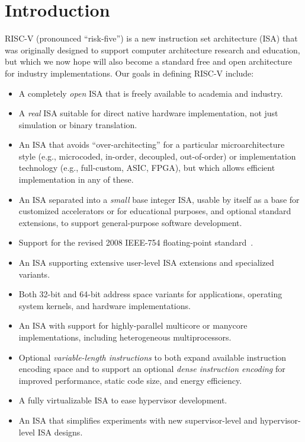\chapter{Introduction}

RISC-V (pronounced ``risk-five'') is a new instruction set
architecture (ISA) that was originally designed to support computer
architecture research and education, but which we now hope will also
become a standard free and open architecture for industry
implementations.  Our goals in defining RISC-V include:
\vspace{-0.1in}
\begin{itemize}
\parskip 0pt
\itemsep 1pt
\item A completely {\em open} ISA that is freely available to
  academia and industry.
\item A {\em real} ISA suitable for direct native hardware implementation,
  not just simulation or binary translation.
\item An ISA that avoids ``over-architecting'' for a particular
  microarchitecture style (e.g., microcoded, in-order, decoupled,
  out-of-order) or implementation technology (e.g., full-custom, ASIC,
  FPGA), but which allows efficient implementation in any of these.
\item An ISA separated into a {\em small} base integer ISA, usable by
  itself as a base for customized accelerators or for educational
  purposes, and optional standard extensions, to support
  general-purpose software development.
\item Support for the revised 2008 IEEE-754 floating-point standard~\cite{ieee754-2008}.
\item An ISA supporting extensive user-level ISA extensions and
  specialized variants.
\item Both 32-bit and 64-bit address space variants for
  applications, operating system kernels, and hardware implementations.
\item An ISA with support for highly-parallel multicore
  or manycore implementations, including heterogeneous multiprocessors.
\item Optional {\em variable-length instructions} to both expand available
  instruction encoding space and to support an optional {\em dense
  instruction encoding} for improved performance, static code size,
  and energy efficiency.
\item A fully virtualizable ISA to ease hypervisor development.
\item An ISA that simplifies experiments with new supervisor-level and
  hypervisor-level ISA designs.
\end{itemize}
\vspace{-0.1in}

